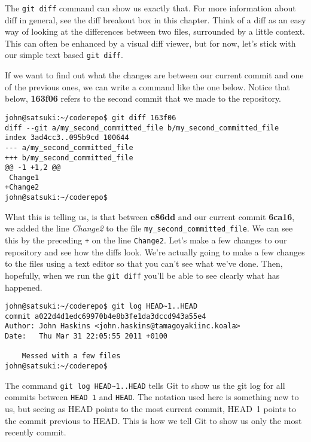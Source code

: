 The \texttt{git diff} command can show us exactly that.  For more information about diff in general, see the diff breakout box in this chapter.  Think of a diff as an easy way of looking at the differences between two files, surrounded by a little context.  This can often be enhanced by a visual diff viewer, but for now, let's stick with our simple text based \texttt{git diff}.  

If we want to find out what the changes are between our current commit and one of the previous ones, we can write a command like the one below.  Notice that below, \textbf{163f06} refers to the second commit that we made to the repository.  

\begin{Verbatim}[frame=leftline,framerule=1mm,fontsize=\relsize{-3}] 
john@satsuki:~/coderepo$ git diff 163f06
diff --git a/my_second_committed_file b/my_second_committed_file
index 3ad4cc3..095b9cd 100644
--- a/my_second_committed_file
+++ b/my_second_committed_file
@@ -1 +1,2 @@
 Change1
+Change2
john@satsuki:~/coderepo$ 
\end{Verbatim}

What this is telling us, is that between \textbf{e86dd} and our current commit \textbf{6ca16}, we added the line \emph{Change2} to the file \texttt{my\_second\_committed\_file}.  We can see this by the preceding \texttt{+} on the line \texttt{Change2}.  Let's make a few changes to our repository and see how the diffs look.  We're actually going to make a few changes to the files using a text editor so that you can't see what we've done.  Then, hopefully, when we run the \texttt{git diff} you'll be able to see clearly what has happened.

\begin{Verbatim}[frame=leftline,framerule=1mm,fontsize=\relsize{-3}] 
john@satsuki:~/coderepo$ git log HEAD~1..HEAD
commit a022d4d1edc69970b4e8b3fe1da3dccd943a55e4
Author: John Haskins <john.haskins@tamagoyakiinc.koala>
Date:   Thu Mar 31 22:05:55 2011 +0100

    Messed with a few files
john@satsuki:~/coderepo$ 
\end{Verbatim}

The command \texttt{git log HEAD\textasciitilde1..HEAD} tells Git to show us the git log for all commits between \texttt{HEAD~1} and \texttt{HEAD}.  The notation used here is something new to us, but seeing as HEAD points to the most current commit, HEAD~1 points to the commit previous to HEAD.  This is how we tell Git to show us only the most recently commit.  

